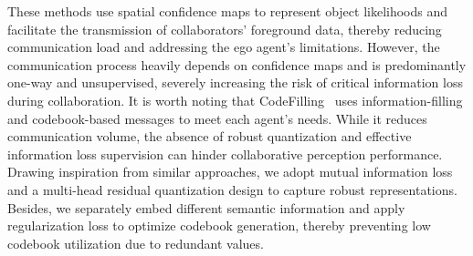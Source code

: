 \documentclass[lettersize,journal]{IEEEtran}
\providecommand{\DIFadd}[1]{{\protect\color{blue}\uwave{#1}}} %
\providecommand{\DIFaddbegin}{} %
\providecommand{\DIFaddend}{} %
\newcommand{\DIFaddincludegraphics}[2][]{{\color{blue}\fbox{\DIFOincludegraphics[#1]{#2}}}} %
\DeclareRobustCommand{\DIFaddbegin}{\DIFOaddbegin \let\includegraphics\DIFaddincludegraphics} %
\DeclareRobustCommand{\DIFaddend}{\DIFOaddend \let\includegraphics\DIFOincludegraphics} %
\begin{document}
These methods use spatial confidence maps to represent object likelihoods and facilitate the transmission of collaborators' foreground data, thereby reducing communication load and addressing the ego agent's limitations. However, the communication process heavily depends on confidence maps and is predominantly one-way and unsupervised, severely increasing the risk of critical information loss during collaboration.
It is worth noting that CodeFilling~\cite{codefilling} uses information-filling and codebook-based messages to meet each agent's needs. While it reduces communication volume, the absence of robust quantization and effective information loss supervision can hinder collaborative perception performance. 
Drawing inspiration from similar approaches, we adopt mutual information loss and a multi-head residual quantization design to capture robust representations. Besides, we separately embed different semantic information and apply \DIFaddbegin \DIFadd{a }\DIFaddend regularization loss to optimize codebook generation, thereby preventing low codebook utilization due to redundant values.
\end{document}
